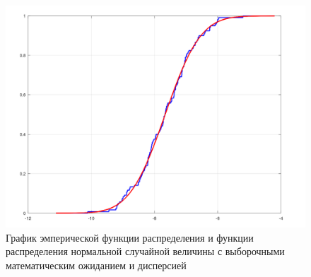 \documentclass[a4paper,14pt, unknownkeysallowed]{extreport}
\begin{document}
\begin{figure}[h]
	\centering
	\includegraphics[scale=0.5]{img/emperic.png}
	\caption{График эмперической функции распределения и функции распределения нормальной случайной величины с выборочными математическим ожиданием и дисперсией}
	\label{fig:emperic}
\end{figure}
\end{document}
